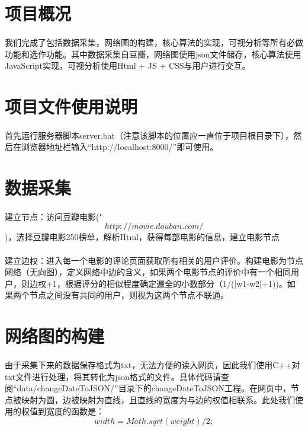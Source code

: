 \documentclass{article}
\begin{document}
\begin{CJK}{UTF8}{gkai}
\section{项目概况} %
	\paragraph{}
	我们完成了包括数据采集，网络图的构建，核心算法的实现，可视分析等所有必做功能和选作功能。其中数据采集自豆瓣，网络图使用json文件储存，核心算法使用JavaScript实现，可视分析使用Html + JS + CSS与用户进行交互。

\section{项目文件使用说明} %
	\paragraph{}
	首先运行服务器脚本server.bat（注意该脚本的位置应一直位于项目根目录下），然后在浏览器地址栏输入“http://localhost:8000/”即可使用。

\section{数据采集} %
	\paragraph{}
	建立节点：访问豆瓣电影("$$http://movie.douban.com/$$)，选择豆瓣电影250榜单，解析Html，获得每部电影的信息，建立电影节点
	\paragraph{}
	建立边权：进入每一个电影的评论页面获取所有相关的用户评价。构建电影为节点网络（无向图），定义网络中边的含义，如果两个电影节点的评价中有一个相同用户，则边权+1，根据评分的相似程度确定遍全的小数部分（1/(|w1-w2|+1))。如果两个节点之间没有共同的用户，则视为这两个节点不联通。


\section{网络图的构建} %
	\paragraph{}
	由于采集下来的数据保存格式为txt，无法方便的读入网页，因此我们使用C++对txt文件进行处理，将其转化为json格式的文件。具体代码请查阅“data/changeDateToJSON/”目录下的changeDateToJSON工程。在网页中，节点被映射为圆，边被映射为直线，且直线的宽度为与边的权值相联系。此处我们使用的权值到宽度的函数是：
		$$width = Math.sqrt(weight)/2;$$


\end{CJK}
\end{document}
